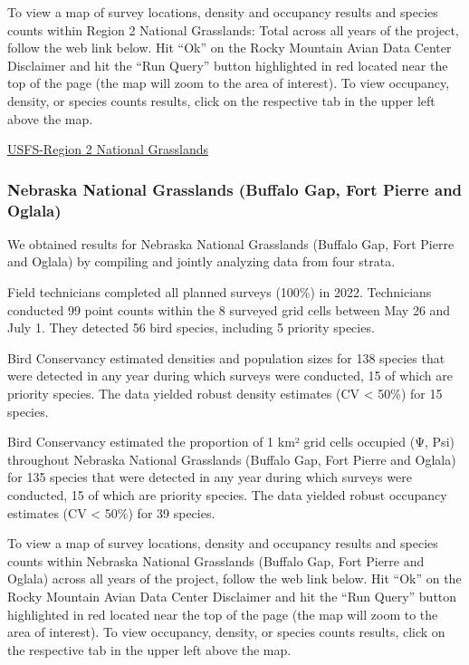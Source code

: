 \documentclass[
  letterpaper,
  DIV=11,
  numbers=noendperiod,
  oneside]{scrreprt}
\begin{document}
To view a map of survey locations, density and occupancy results and
species counts within Region 2 National Grasslands: Total across all
years of the project, follow the web link below. Hit ``Ok'' on the Rocky
Mountain Avian Data Center Disclaimer and hit the ``Run Query'' button
highlighted in red located near the top of the page (the map will zoom
to the area of interest). To view occupancy, density, or species counts
results, click on the respective tab in the upper left above the map.

\href{http://www.rmbo.org/new_site/adc/QueryWindow.aspx\#N4IgzgrgDgpgTmALnAhoiBbEAuABCAVQGUAxIgWgCUYBzASwHsA7XAJlwDk1GmUAbXAHFUYMHxRMAJmBABfIA===}{USFS-Region
2 National Grasslands}

\hypertarget{nebraska-national-grasslands-buffalo-gap-fort-pierre-and-oglala}{%
\subsubsection{Nebraska National Grasslands (Buffalo Gap, Fort Pierre
and
Oglala)}\label{nebraska-national-grasslands-buffalo-gap-fort-pierre-and-oglala}}

We obtained results for Nebraska National Grasslands (Buffalo Gap, Fort
Pierre and Oglala) by compiling and jointly analyzing data from four
strata.

Field technicians completed all planned surveys (100\%) in 2022.
Technicians conducted 99 point counts within the 8 surveyed grid cells
between May 26 and July 1. They detected 56 bird species, including 5
priority species.

Bird Conservancy estimated densities and population sizes for 138
species that were detected in any year during which surveys were
conducted, 15 of which are priority species. The data yielded robust
density estimates (CV \textless{} 50\%) for 15 species.

Bird Conservancy estimated the proportion of 1 km² grid cells occupied
(Ψ, Psi) throughout Nebraska National Grasslands (Buffalo Gap, Fort
Pierre and Oglala) for 135 species that were detected in any year during
which surveys were conducted, 15 of which are priority species. The data
yielded robust occupancy estimates (CV \textless{} 50\%) for 39 species.

To view a map of survey locations, density and occupancy results and
species counts within Nebraska National Grasslands (Buffalo Gap, Fort
Pierre and Oglala) across all years of the project, follow the web link
below. Hit ``Ok'' on the Rocky Mountain Avian Data Center Disclaimer and
hit the ``Run Query'' button highlighted in red located near the top of
the page (the map will zoom to the area of interest). To view occupancy,
density, or species counts results, click on the respective tab in the
upper left above the map.
\end{document}
